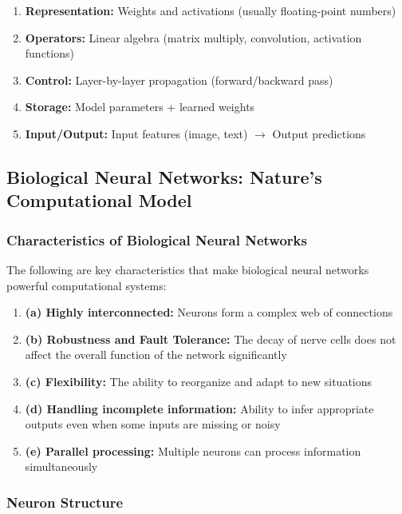 \begin{enumerate}
\item \textbf{Representation:} Weights and activations (usually floating-point numbers)
\item \textbf{Operators:} Linear algebra (matrix multiply, convolution, activation functions)
\item \textbf{Control:} Layer-by-layer propagation (forward/backward pass)
\item \textbf{Storage:} Model parameters + learned weights
\item \textbf{Input/Output:} Input features (image, text) $\rightarrow$ Output predictions
\end{enumerate}

\subsection{Biological Neural Networks: Nature's Computational Model}
\label{subsec:biological-neural-networks}

\subsubsection{Characteristics of Biological Neural Networks}
\label{subsubsec:characteristics-biological-nn}

The following are key characteristics that make biological neural networks powerful computational systems:

\begin{enumerate}
\item \textbf{(a) Highly interconnected:} Neurons form a complex web of connections
\item \textbf{(b) Robustness and Fault Tolerance:} The decay of nerve cells does not affect the overall function of the network significantly
\item \textbf{(c) Flexibility:} The ability to reorganize and adapt to new situations
\item \textbf{(d) Handling incomplete information:} Ability to infer appropriate outputs even when some inputs are missing or noisy
\item \textbf{(e) Parallel processing:} Multiple neurons can process information simultaneously
\end{enumerate}

\subsubsection{Neuron Structure}
\label{subsubsec:neuron-structure}

